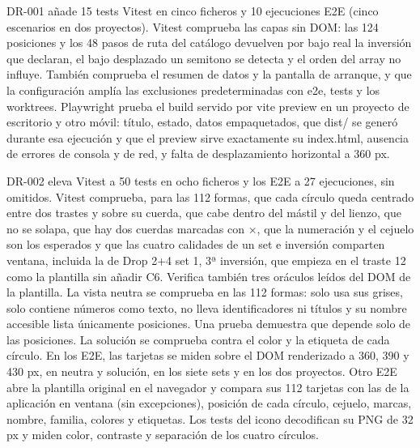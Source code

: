 \documentclass[a4paper,11pt]{article}
\begin{document}
DR-001 añade 15 tests Vitest en cinco ficheros y 10 ejecuciones E2E
(cinco escenarios en dos proyectos). Vitest comprueba las capas sin DOM:
las 124 posiciones y los 48 pasos de ruta del catálogo devuelven por
bajo real la inversión que declaran, el bajo desplazado un semitono se
detecta y el orden del array no influye. También comprueba el resumen de
datos y la pantalla de arranque, y que la configuración amplía las
exclusiones predeterminadas con e2e, tests y los worktrees. Playwright
prueba el build servido por vite preview en un proyecto de escritorio y
otro móvil: título, estado, datos empaquetados, que dist/ se generó
durante esa ejecución y que el preview sirve exactamente su index.html,
ausencia de errores de consola y de red, y falta de desplazamiento
horizontal a 360 px.

DR-002 eleva Vitest a 50 tests en ocho ficheros y los E2E a 27
ejecuciones, sin omitidos. Vitest comprueba, para las 112 formas, que
cada círculo queda centrado entre dos trastes y sobre su cuerda, que
cabe dentro del mástil y del lienzo, que no se solapa, que hay dos
cuerdas marcadas con ×, que la numeración y el cejuelo son los esperados
y que las cuatro calidades de un set e inversión comparten ventana,
incluida la de Drop 2+4 set 1, 3ª inversión, que empieza en el traste 12
como la plantilla sin añadir C6. Verifica también tres oráculos leídos
del DOM de la plantilla. La vista neutra se comprueba en las 112 formas:
solo usa sus grises, solo contiene números como texto, no lleva
identificadores ni títulos y su nombre accesible lista únicamente
posiciones. Una prueba demuestra que depende solo de las posiciones. La
solución se comprueba contra el color y la etiqueta de cada círculo. En
los E2E, las tarjetas se miden sobre el DOM renderizado a 360, 390 y 430
px, en neutra y solución, en los siete sets y en los dos proyectos. Otro
E2E abre la plantilla original en el navegador y compara sus 112
tarjetas con las de la aplicación en ventana (sin excepciones), posición
de cada círculo, cejuelo, marcas, nombre, familia, colores y etiquetas.
Los tests del icono decodifican su PNG de 32 px y miden color, contraste
y separación de los cuatro círculos.
\end{document}
